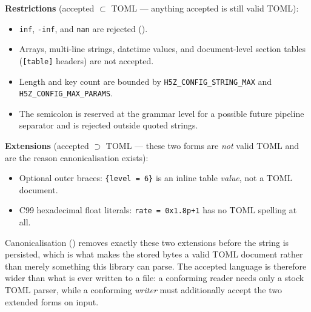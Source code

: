 \documentclass[../RFC-HDFG-2026-001.tex]{subfiles}
\begin{document}
\textbf{Restrictions} (accepted $\subset$ TOML --- anything accepted is
still valid TOML):

\begin{itemize}
\item \texttt{inf}, \texttt{-inf}, and \texttt{nan} are rejected
  ().
\item Arrays, multi-line strings, datetime values, and document-level
  section tables (\texttt{[table]} headers) are not accepted.
\item Length and key count are bounded by
  \texttt{H5Z\_CONFIG\_STRING\_MAX} and
  \texttt{H5Z\_CONFIG\_MAX\_PARAMS}.
\item The semicolon is reserved at the grammar level for a possible future
  pipeline separator and is rejected outside quoted strings.
\end{itemize}

\textbf{Extensions} (accepted $\supset$ TOML --- these two forms are
\emph{not} valid TOML and are the reason canonicalisation exists):

\begin{itemize}
\item Optional outer braces: \texttt{\{level = 6\}} is an inline table
  \emph{value}, not a TOML document.
\item C99 hexadecimal float literals: \texttt{rate = 0x1.8p+1} has no TOML
  spelling at all.
\end{itemize}

Canonicalisation () removes exactly
these two extensions before the string is persisted, which is what makes the
stored bytes a valid TOML document rather than merely something this library
can parse.  The accepted language is therefore wider than what is ever
written to a file: a conforming reader needs only a stock TOML parser, while
a conforming \emph{writer} must additionally accept the two extended forms
on input.

\end{document}
